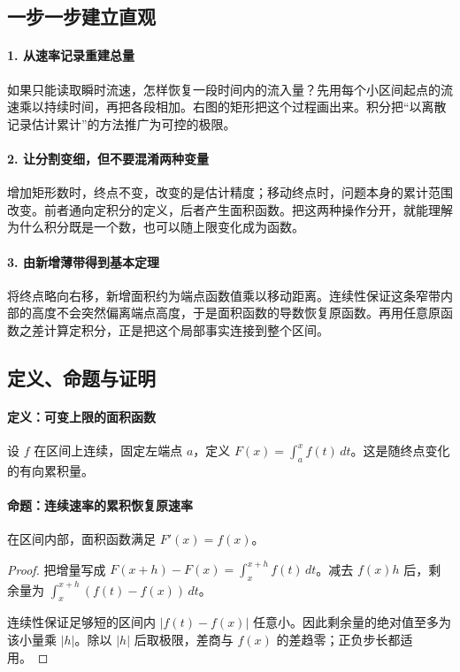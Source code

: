 \subsection*{一步一步建立直观}

\paragraph{1. 从速率记录重建总量}

如果只能读取瞬时流速，怎样恢复一段时间内的流入量？先用每个小区间起点的流速乘以持续时间，再把各段相加。右图的矩形把这个过程画出来。积分把“以离散记录估计累计”的方法推广为可控的极限。



\paragraph{2. 让分割变细，但不要混淆两种变量}

增加矩形数时，终点不变，改变的是估计精度；移动终点时，问题本身的累计范围改变。前者通向定积分的定义，后者产生面积函数。把这两种操作分开，就能理解为什么积分既是一个数，也可以随上限变化成为函数。



\paragraph{3. 由新增薄带得到基本定理}

将终点略向右移，新增面积约为端点函数值乘以移动距离。连续性保证这条窄带内部的高度不会突然偏离端点高度，于是面积函数的导数恢复原函数。再用任意原函数之差计算定积分，正是把这个局部事实连接到整个区间。



\subsection*{定义、命题与证明}

\paragraph{定义：可变上限的面积函数}

设 $f$ 在区间上连续，固定左端点 $a$，定义 $F(x)=\int_a^x f(t)\,dt$。这是随终点变化的有向累积量。

\paragraph{命题：连续速率的累积恢复原速率}

在区间内部，面积函数满足 $F'(x)=f(x)$。

\begin{proof}

把增量写成 $F(x+h)-F(x)=\int_x^{x+h}f(t)\,dt$。减去 $f(x)h$ 后，剩余量为 $\int_x^{x+h}(f(t)-f(x))\,dt$。

连续性保证足够短的区间内 $|f(t)-f(x)|$ 任意小。因此剩余量的绝对值至多为该小量乘 $|h|$。除以 $|h|$ 后取极限，差商与 $f(x)$ 的差趋零；正负步长都适用。

\end{proof}
